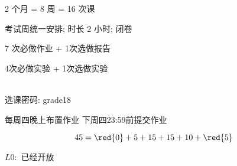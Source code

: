 
\begin{frame}{}
  \begin{center}
    {\large 2 个月 = 8 周 = 16 次课}
  \end{center}

\end{frame}

\begin{frame}{}
  \begin{center}
     考试周统一安排; 时长 2 小时; 闭卷
    \vspace{1.00cm}

     7 次必做作业 + 1次选做报告 

    \vspace{1.00cm}
     4次必做实验 + 1次选做实验 
  \end{center}
\end{frame}

\begin{frame}{}
  \begin{center}
     \\[10pt]
    选课密码: grade18

    \vspace{1.50cm}
    每周四晚上布置作业 \qquad 下周四23:59前提交作业
  \end{center}
\end{frame}

\begin{frame}{}
  \[
    45 = \red{0} + 5 + 15 + 15 + 10 + \red{5}
  \]

  \vspace{0.30cm}

  \begin{center}

    \vspace{0.80cm}
    $L0:$ 已经开放
  \end{center}
\end{frame}

% 

